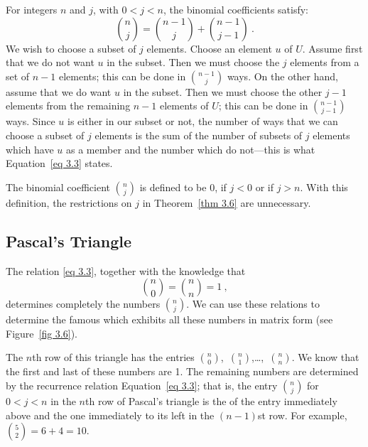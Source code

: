 \begin{theorem}\label{thm 3.6}                 
For integers $n$ and $j$, with $0 < j < n$, the binomial coefficients satisfy:
\begin{equation} {n \choose j} = {{n-1} \choose j} + {{n-1} \choose {j - 1}}\ .
\label{eq 3.3}                                                                              
\end{equation}
\proof We wish to choose a subset of $j$ elements.  Choose an element $u$ of $U$. 
Assume first that we do not want $u$ in the subset.  Then we must choose the
$j$ elements from a set of $n - 1$ elements; this can be done in ${{n-1} \choose j}$ 
ways.  On the other hand, assume that we do want $u$ in the subset.  Then we must
choose the other $j - 1$ elements from the remaining $n - 1$ elements of $U$; this can
be done in ${{n-1} \choose {j - 1}}$ ways.  Since $u$ is either in our subset or not,
the number of ways that we can choose a subset of $j$ elements is the sum of the
number of subsets of $j$ elements which have
$u$ as a member and the number which do not---this is what Equation~\ref{eq 3.3} states. 
\end{theorem}

The binomial coefficient $n \choose j$ is defined to be 0, if $j < 0$ or if $j > n$.  With
this definition, the restrictions on $j$ in Theorem~\ref{thm 3.6} are unnecessary.

\subsection*{Pascal's Triangle}

The relation \ref{eq 3.3},                                    
 together with the knowledge that
$$ {n \choose 0} = {n \choose n }= 1\ ,
$$ determines completely the numbers $n \choose j$. We can use these relations to
determine the famous  which exhibits all these
numbers in matrix form (see Figure~\ref{fig 3.6}).          


The $n$th row of this triangle has the entries $n \choose 0$,~$n \choose 1$,\dots,~$n
\choose n$.   We know that the first and last of these numbers are 1.  The remaining
numbers are determined by the recurrence relation 
Equation~\ref{eq 3.3}; that is, the
entry  ${n \choose j}$ for $0 < j < n$ in the $n$th row of Pascal's
triangle is the  of the entry immediately above and the one immediately to
its left in the $(n - 1)$st row.  For example, ${5 \choose 2} = 6 + 4 = 10$.

